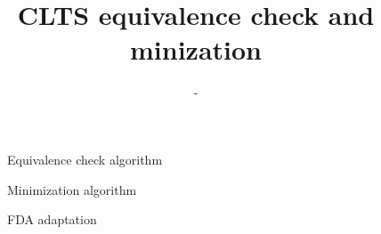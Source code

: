 \documentclass{article}
\title{CLTS equivalence check and minization} %
\author{-} %
\date{}
\theoremstyle{definition}
\begin{document}
\maketitle

\setcounter{section}{1} %
\setcounter{theorem}{1} %


\begin{figure}[ht]
	\begin{center}
		 
		\caption{Equivalence check algorithm}
		\label{fig:equivalence-check}
	\end{center}
\end{figure}

\begin{figure}[ht]
	\begin{center}
		 
		\caption{Minimization algorithm}
		\label{fig:minimization}
	\end{center}
\end{figure}


\begin{figure}[ht]
	\begin{center}
		 
		\caption{FDA adaptation}
		\label{fig:fda-adaptation}
	\end{center}
\end{figure}
\end{document}
